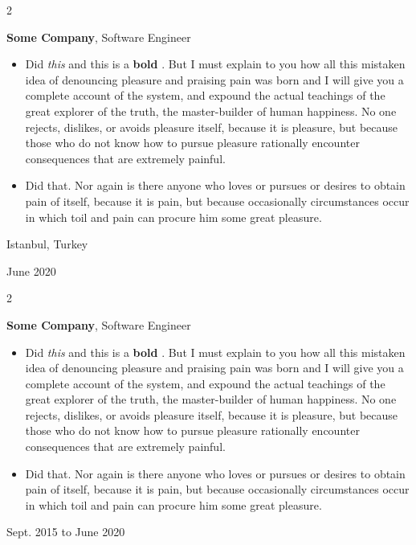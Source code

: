 \documentclass[10pt, letterpaper]{article}
\newenvironment{highlights}{
    \begin{itemize}[
        topsep=0.10 cm,
        parsep=0.10 cm,
        partopsep=0pt,
        itemsep=0pt,
        leftmargin=0.4 cm + 10pt
    ]
}{
    \end{itemize}
} %
\newenvironment{twocolentry}[2][]{
    \onecolentry
    \def\secondColumn{#2}
    \setcolumnwidth{\fill, 4.5 cm}
    \begin{paracol}{2}
}{
    \switchcolumn \raggedleft \secondColumn
    \end{paracol}
    \endonecolentry
} %
\let\hrefWithoutArrow\href
\renewcommand{\href}[2]{\hrefWithoutArrow{#1}{\mbox{\ifthenelse{\equal{#2}{}}{ }{#2 }\raisebox{.15ex}{\footnotesize \faExternalLink*}}}}
\begin{document}
        \begin{twocolentry}{
            Istanbul, Turkey

        June 2020
        }
            \textbf{Some \textnormal{Company}}, Software Engineer
            \begin{highlights}
                \item Did \textit{this} and this is a \textbf{bold} \href{https://example.com}{link}. But I must explain to you how all this mistaken idea of denouncing pleasure and praising pain was born and I will give you a complete account of the system, and expound the actual teachings of the great explorer of the truth, the master-builder of human happiness. No one rejects, dislikes, or avoids pleasure itself, because it is pleasure, but because those who do not know how to pursue pleasure rationally encounter consequences that are extremely painful.
                \item Did that. Nor again is there anyone who loves or pursues or desires to obtain pain of itself, because it is pain, but because occasionally circumstances occur in which toil and pain can procure him some great pleasure.
            \end{highlights}
        \end{twocolentry}


        \vspace{0.2 cm}

        \begin{twocolentry}{
            Sept. 2015 to June 2020
        }
            \textbf{Some \textnormal{Company}}, Software Engineer
            \begin{highlights}
                \item Did \textit{this} and this is a \textbf{bold} \href{https://example.com}{link}. But I must explain to you how all this mistaken idea of denouncing pleasure and praising pain was born and I will give you a complete account of the system, and expound the actual teachings of the great explorer of the truth, the master-builder of human happiness. No one rejects, dislikes, or avoids pleasure itself, because it is pleasure, but because those who do not know how to pursue pleasure rationally encounter consequences that are extremely painful.
                \item Did that. Nor again is there anyone who loves or pursues or desires to obtain pain of itself, because it is pain, but because occasionally circumstances occur in which toil and pain can procure him some great pleasure.
            \end{highlights}
        \end{twocolentry}
\end{document}
